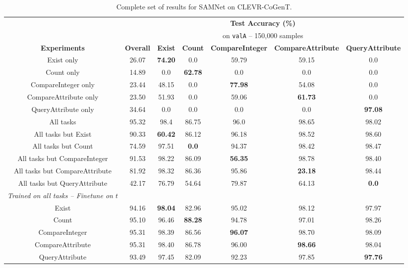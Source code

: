 \begin{table*}[htb]
	\centering
	\begin{adjustbox}{width=\textwidth}
	\begin{tabular}{c c c c c c c}
		\toprule
		& \multicolumn{6}{c}{\textbf{Test Accuracy (\%)}} \\  
	    & \multicolumn{6}{c}{on \texttt{valA} -- 150,000 samples} \\ 
		\cmidrule(lr){2-7}
		\textbf{Experiments} & \textbf{Overall}& \textbf{Exist}  & \textbf{Count} & \textbf{CompareInteger} & \textbf{CompareAttribute} & \textbf{QueryAttribute}\\ 
		\cmidrule(lr){1-1}
		\cmidrule(lr){2-7}
		Exist only & 26.07 & \textbf{74.20}	& 0.0	& 59.79	& 59.15 & 0.0 \\ 
		Count only & 14.89  & 0.0	& \textbf{62.78}	& 0.0 & 0.0 & 0.0 \\ 
		CompareInteger only & 23.44 & 48.15	& 0.0	& \textbf{77.98}	& 54.08 & 0.0 \\ 
		CompareAttribute only & 23.50 & 51.93	& 0.0 & 59.06 & \textbf{61.73} & 0.0 \\ 
		QueryAttribute only & 34.64 	& 0.0	& 0.0	& 0.0 & 0.0 & \textbf{97.08} \\ 		
		\cmidrule(lr){1-1}
		\cmidrule(lr){2-7}
		
		All tasks & 95.32 & 98.4 	& 86.75	& 96.0	& 98.65	& 98.02 \\ 
		\cmidrule(lr){1-1}
		\cmidrule(lr){2-7}
		
		All tasks but Exist & 90.33 	& \textbf{60.42}	& 86.12	& 96.18	& 98.52 & 98.60 \\ 
		All tasks but Count & 74.59 	& 97.51	& \textbf{0.0}	& 94.37	& 98.42 & 98.47 \\ 
		All tasks but CompareInteger & 91.53 	& 98.22	& 86.09	& \textbf{56.35}	& 98.78 & 98.40 \\ 
		All tasks but CompareAttribute & 81.92 	& 98.32	& 86.36	& 95.86	& \textbf{23.18} & 98.44 \\ 
		All tasks but QueryAttribute & 42.17 	& 76.79	& 54.64	& 79.87 & 64.13 & \textbf{0.0} \\ 
		
		\cmidrule(lr){1-1}
		\cmidrule(lr){2-7}
		
		\textit{Trained on all tasks -- Finetune on $t$} & &  & &  & &\\ 
		Exist & 94.16 & \textbf{98.04} & 82.96 & 95.02 & 98.12 & 97.97 \\ 
		Count & 95.10 & 96.46 & \textbf{88.28} & 94.78 & 97.01 & 98.26 \\
		CompareInteger & 95.31 & 98.39 & 86.56 & \textbf{96.07} & 98.70 & 98.09 \\
		CompareAttribute & 95.31 & 98.40 & 86.78 & 96.00 & \textbf{98.66} & 98.04 \\
		QueryAttribute & 93.49 & 97.45 & 82.09 & 92.23 & 97.85& \textbf{97.76} \\
		
		\bottomrule
	\end{tabular}
	\end{adjustbox}
	\caption{Complete set of results for SAMNet on CLEVR-CoGenT.}
	\label{tab:CoGenT-results}
\end{table*}

